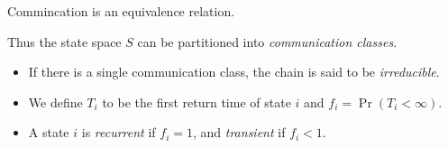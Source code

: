 \begin{exercise}
    Commincation is an equivalence relation.
\end{exercise}

Thus the state space $S$ can be partitioned into
\emph{communication classes}.

\begin{definition*} \leavevmode
    \begin{itemize}
        \item If there is a single communication class,
            the chain is said to be \emph{irreducible}.
        \item We define $T_i$ to be the first return time of state $i$
            and $f_i = \Pr(T_i < \infty)$.
        \item A state $i$ is \emph{recurrent} if $f_i = 1$,
            and \emph{transient} if $f_i < 1$.
    \end{itemize}
\end{definition*}
